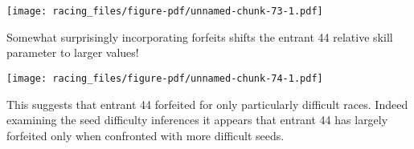 \documentclass[
  letterpaper,
  DIV=11,
  numbers=noendperiod]{scrartcl}
\newenvironment{Shaded}{\begin{snugshade}}{\end{snugshade}}
\newcommand{\AttributeTok}[1]{\textcolor[rgb]{0.40,0.45,0.13}{#1}}
\newcommand{\ConstantTok}[1]{\textcolor[rgb]{0.56,0.35,0.01}{#1}}
\newcommand{\DecValTok}[1]{\textcolor[rgb]{0.68,0.00,0.00}{#1}}
\newcommand{\FloatTok}[1]{\textcolor[rgb]{0.68,0.00,0.00}{#1}}
\newcommand{\FunctionTok}[1]{\textcolor[rgb]{0.28,0.35,0.67}{#1}}
\newcommand{\NormalTok}[1]{\textcolor[rgb]{0.00,0.23,0.31}{#1}}
\newcommand{\SpecialCharTok}[1]{\textcolor[rgb]{0.37,0.37,0.37}{#1}}
\newcommand{\StringTok}[1]{\textcolor[rgb]{0.13,0.47,0.30}{#1}}
\begin{document}
\texttt{[image: racing\_files/figure-pdf/unnamed-chunk-73-1.pdf]}

Somewhat surprisingly incorporating forfeits shifts the entrant 44
relative skill parameter to larger values!

\begin{Shaded}
\end{Shaded}

\texttt{[image: racing\_files/figure-pdf/unnamed-chunk-74-1.pdf]}

This suggests that entrant 44 forfeited for only particularly difficult
races. Indeed examining the seed difficulty inferences it appears that
entrant 44 has largely forfeited only when confronted with more
difficult seeds.
\end{document}
